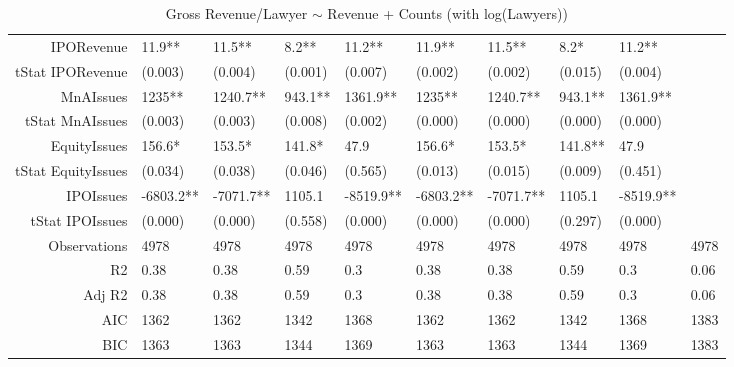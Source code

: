 \begin{table}[ht]
\begin{tabular}{rlllllllll}
  IPORevenue & 11.9** & 11.5** & 8.2** & 11.2** & 11.9** & 11.5** & 8.2* & 11.2** &  \\ 
  tStat IPORevenue & (0.003) & (0.004) & (0.001) & (0.007) & (0.002) & (0.002) & (0.015) & (0.004) &  \\ 
  MnAIssues & 1235** & 1240.7** & 943.1** & 1361.9** & 1235** & 1240.7** & 943.1** & 1361.9** &  \\ 
  tStat MnAIssues & (0.003) & (0.003) & (0.008) & (0.002) & (0.000) & (0.000) & (0.000) & (0.000) &  \\ 
  EquityIssues & 156.6* & 153.5* & 141.8* & 47.9 & 156.6* & 153.5* & 141.8** & 47.9 &  \\ 
  tStat EquityIssues & (0.034) & (0.038) & (0.046) & (0.565) & (0.013) & (0.015) & (0.009) & (0.451) &  \\ 
  IPOIssues & -6803.2** & -7071.7** & 1105.1 & -8519.9** & -6803.2** & -7071.7** & 1105.1 & -8519.9** &  \\ 
  tStat IPOIssues & (0.000) & (0.000) & (0.558) & (0.000) & (0.000) & (0.000) & (0.297) & (0.000) &  \\ 
  Observations & 4978 & 4978 & 4978 & 4978 & 4978 & 4978 & 4978 & 4978 & 4978 \\ 
  R2 & 0.38 & 0.38 & 0.59 & 0.3 & 0.38 & 0.38 & 0.59 & 0.3 & 0.06 \\ 
  Adj R2 & 0.38 & 0.38 & 0.59 & 0.3 & 0.38 & 0.38 & 0.59 & 0.3 & 0.06 \\ 
  AIC & 1362 & 1362 & 1342 & 1368 & 1362 & 1362 & 1342 & 1368 & 1383 \\ 
  BIC & 1363 & 1363 & 1344 & 1369 & 1363 & 1363 & 1344 & 1369 & 1383 \\ 
   \hline
\end{tabular}
\caption{Gross Revenue/Lawyer $\sim$ Revenue + Counts (with log(Lawyers))} 
\end{table}
